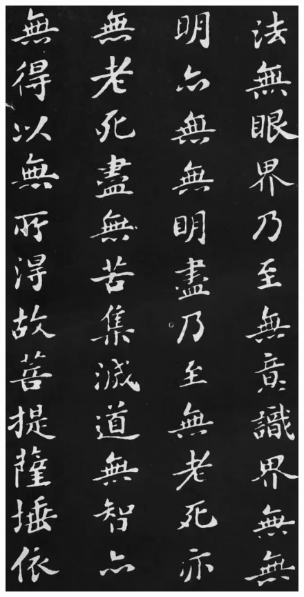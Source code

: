 \documentclass[a4paper,twoside]{article}
\begin{document}
\begin{figure}[ht]
\centering
\includegraphics[width=12.2cm]{images/sushi-3}
\end{figure}
\end{document}
